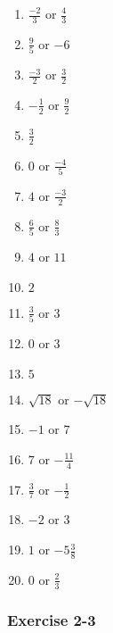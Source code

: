 {\begin{multicols}{3}

\begin{enumerate}[itemsep=1pt,  label=\textbf{\arabic*}. ] 
\item $\frac{-2}{3}$ or $\frac{4}{3}$%
\item $\frac{9}{5}$ or $-6$%
\item $\frac{-3}{2}$ or $\frac{3}{2}$%
\item $-\frac{1}{2}$ or $\frac{9}{2}$%
\item $\frac{3}{2}$%
\item $0$ or $\frac{-4}{5}$%
\item$4$ or $\frac{-3}{2}$ %
\item $\frac{6}{5}$ or $\frac{8}{3}$%
\item $4$ or $11$%
\item $2$%
\item $ \frac{3}{5}$ or $3$%
\item $0$ or $3$%
\item $5$%
\item $\sqrt{18}$ or $-\sqrt{18}$%
\item $-1$ or $7$%
\item $7$ or $-\frac{11}{4}$%
\item $\frac{3}{7}$ or $-\frac{1}{2}$%
\item $-2$ or $3$%
\item  $1$ or $-5\frac{3}{8}$%
\item  $0$ or $\frac{2}{3}$%
\end{enumerate}




\subsubsection*{Exercise 2-3} %

\begin{enumerate}[noitemsep, label=\textbf{\arabic*}. ] 


\end{enumerate}
\end{multicols}}
